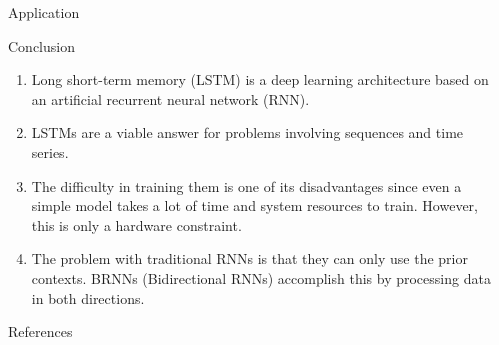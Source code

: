 \documentclass[final]{beamer}
\newlength{\sepwidth}
\newlength{\colwidth}
\newcommand{\separatorcolumn}{\begin{column}{\sepwidth}\end{column}}
\begin{document}
\begin{frame}[t]
\begin{columns}[t]
\begin{column}{\colwidth}
\begin{block}{Application}
  \end{block}

  \begin{block}{Conclusion}

    \begin{enumerate}
    \item  \hspace{0.04cm} Long short-term memory (LSTM) is a deep learning architecture based on an artificial recurrent neural network (RNN).\newline
    \item  \hspace{0.04cm} LSTMs are a viable answer for problems involving sequences and time series.\newline
    \item  \hspace{0.04cm} The difficulty in training them is one of its disadvantages since even  a simple model takes a lot of time and system resources to train. However, this is only a hardware constraint.\newline
    \item  \hspace{0.04cm} The problem with traditional RNNs is that they can only use the prior contexts. BRNNs (Bidirectional RNNs) accomplish this by processing data in both directions.
    \end{enumerate}


    

  \end{block}

  \begin{block}{References}

    \nocite{*}
    \footnotesize{}

  \end{block}

\end{column}

\separatorcolumn
\end{columns}
\end{frame}
\end{document}
